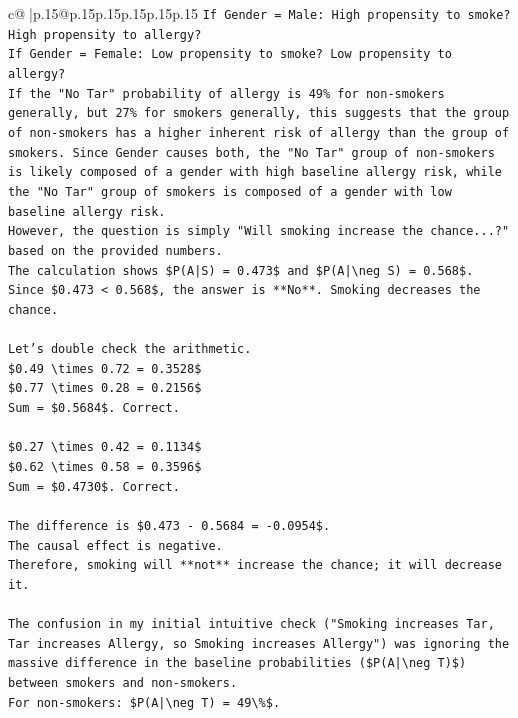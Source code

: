\documentclass{article}
\begin{document}
{\begin{supertabular}{c@{$\;$}|p{.15\linewidth}@{}p{.15\linewidth}p{.15\linewidth}p{.15\linewidth}p{.15\linewidth}p{.15\linewidth}}
{{{\texttt{If Gender = Male: High propensity to smoke? High propensity to allergy?} \\
\texttt{If Gender = Female: Low propensity to smoke? Low propensity to allergy?} \\
\texttt{If the "No Tar" probability of allergy is 49\% for non{-}smokers generally, but 27\% for smokers generally, this suggests that the group of non{-}smokers has a higher inherent risk of allergy than the group of smokers. Since Gender causes both, the "No Tar" group of non{-}smokers is likely composed of a gender with high baseline allergy risk, while the "No Tar" group of smokers is composed of a gender with low baseline allergy risk.} \\
\texttt{However, the question is simply "Will smoking increase the chance...?" based on the provided numbers.} \\
\texttt{The calculation shows \$P(A|S) = 0.473\$ and \$P(A|\textbackslash{}neg S) = 0.568\$.} \\
\texttt{Since \$0.473 < 0.568\$, the answer is **No**. Smoking decreases the chance.} \\
\\ 
\texttt{Let's double check the arithmetic.} \\
\texttt{\$0.49 \textbackslash{}times 0.72 = 0.3528\$} \\
\texttt{\$0.77 \textbackslash{}times 0.28 = 0.2156\$} \\
\texttt{Sum = \$0.5684\$. Correct.} \\
\\ 
\texttt{\$0.27 \textbackslash{}times 0.42 = 0.1134\$} \\
\texttt{\$0.62 \textbackslash{}times 0.58 = 0.3596\$} \\
\texttt{Sum = \$0.4730\$. Correct.} \\
\\ 
\texttt{The difference is \$0.473 {-} 0.5684 = {-}0.0954\$.} \\
\texttt{The causal effect is negative.} \\
\texttt{Therefore, smoking will **not** increase the chance; it will decrease it.} \\
\\ 
\texttt{The confusion in my initial intuitive check ("Smoking increases Tar, Tar increases Allergy, so Smoking increases Allergy") was ignoring the massive difference in the baseline probabilities (\$P(A|\textbackslash{}neg T)\$) between smokers and non{-}smokers.} \\
\texttt{For non{-}smokers: \$P(A|\textbackslash{}neg T) = 49\textbackslash{}\%\$.} \\
}}}
\end{supertabular}}
\end{document}
